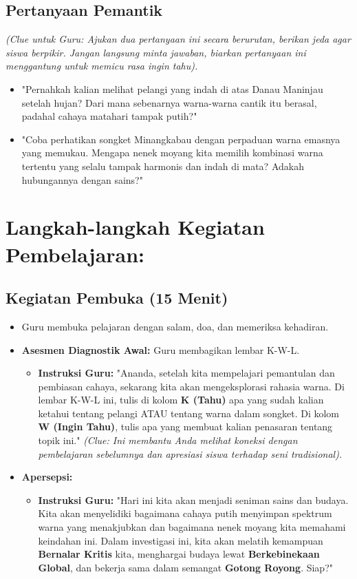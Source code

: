 \documentclass[12pt,a4paper]{article}
\begin{document}
\subsection{Pertanyaan Pemantik}
\textit{(Clue untuk Guru: Ajukan dua pertanyaan ini secara berurutan, berikan jeda agar siswa berpikir. Jangan langsung minta jawaban, biarkan pertanyaan ini menggantung untuk memicu rasa ingin tahu).}

\begin{itemize}
\item "Pernahkah kalian melihat pelangi yang indah di atas Danau Maninjau setelah hujan? Dari mana sebenarnya warna-warna cantik itu berasal, padahal cahaya matahari tampak putih?"
\item "Coba perhatikan songket Minangkabau dengan perpaduan warna emasnya yang memukau. Mengapa nenek moyang kita memilih kombinasi warna tertentu yang selalu tampak harmonis dan indah di mata? Adakah hubungannya dengan sains?"
\end{itemize}

\section{Langkah-langkah Kegiatan Pembelajaran:}

\subsection{Kegiatan Pembuka (15 Menit)}
\begin{itemize}
\item Guru membuka pelajaran dengan salam, doa, dan memeriksa kehadiran.
\item \textbf{Asesmen Diagnostik Awal:} Guru membagikan lembar K-W-L.
    \begin{itemize}
    \item \textbf{Instruksi Guru:} "Ananda, setelah kita mempelajari pemantulan dan pembiasan cahaya, sekarang kita akan mengeksplorasi rahasia warna. Di lembar K-W-L ini, tulis di kolom \textbf{K (Tahu)} apa yang sudah kalian ketahui tentang pelangi ATAU tentang warna dalam songket. Di kolom \textbf{W (Ingin Tahu)}, tulis apa yang membuat kalian penasaran tentang topik ini." \textit{(Clue: Ini membantu Anda melihat koneksi dengan pembelajaran sebelumnya dan apresiasi siswa terhadap seni tradisional).}
    \end{itemize}
\item \textbf{Apersepsi:}
    \begin{itemize}
    \item \textbf{Instruksi Guru:} "Hari ini kita akan menjadi seniman sains dan budaya. Kita akan menyelidiki bagaimana cahaya putih menyimpan spektrum warna yang menakjubkan dan bagaimana nenek moyang kita memahami keindahan ini. Dalam investigasi ini, kita akan melatih kemampuan \textbf{Bernalar Kritis} kita, menghargai budaya lewat \textbf{Berkebinekaan Global}, dan bekerja sama dalam semangat \textbf{Gotong Royong}. Siap?"
    \end{itemize}
\end{itemize}
\end{document}
